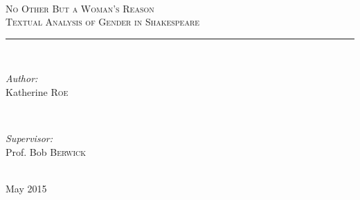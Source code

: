 \documentclass[12pt]{article} %
\begin{document}

\begin{titlepage}

\newcommand{\HRule}{\rule{\linewidth}{0.5mm}} %


\center %

\textsc{\LARGE   }\\[1.5cm] %
\textsc{\Large No Other But a Woman's Reason}\\[0.5cm] %
\textsc{\large Textual Analysis of Gender in Shakespeare}\\[0.5cm] %

\HRule \\[0.4cm]

\begin{minipage}{0.4\textwidth}
\begin{flushleft} \large
\emph{Author:}\\
Katherine \textsc{Roe} %
\end{flushleft}
\end{minipage}
~
\begin{minipage}{0.4\textwidth}
\begin{flushright} \large
\emph{Supervisor:} \\
Prof. Bob \textsc{Berwick} %
\end{flushright}
\end{minipage}\\[4cm]

{\large
}\large May 2015 %


\vfill %

\end{titlepage}

\end{document}
